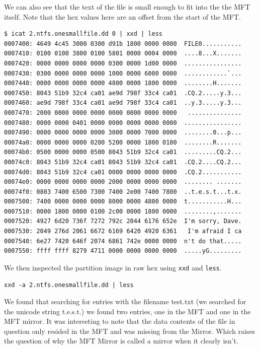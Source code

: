 \documentclass[a4paper,
    11pt,
    normalheadings,
    parindent,
    UKenglish,
    abstracton,
    ]{scrartcl}
\begin{document}
We can also see that the text of the file is small enough to fit into the the MFT itself. Note that the hex values here are an offset from the start of the MFT.
\begin{verbatim}
$ icat 2.ntfs.onesmallfile.dd 0 | xxd | less
0007400: 4649 4c45 3000 0300 d91b 1800 0000 0000  FILE0...........
0007410: 0100 0100 3800 0100 5801 0000 0004 0000  ....8...X.......
0007420: 0000 0000 0000 0000 0300 0000 1d00 0000  ................
0007430: 0300 0000 0000 0000 1000 0000 6000 0000  ............`...
0007440: 0000 0000 0000 0000 4800 0000 1800 0000  ........H.......
0007450: 8043 51b9 32c4 ca01 ae9d 798f 33c4 ca01  .CQ.2.....y.3...
0007460: ae9d 798f 33c4 ca01 ae9d 798f 33c4 ca01  ..y.3.....y.3...
0007470: 2000 0000 0000 0000 0000 0000 0000 0000   ...............
0007480: 0000 0000 0401 0000 0000 0000 0000 0000  ................
0007490: 0000 0000 0000 0000 3000 0000 7000 0000  ........0...p...
00074a0: 0000 0000 0000 0200 5200 0000 1800 0100  ........R.......
00074b0: 0500 0000 0000 0500 8043 51b9 32c4 ca01  .........CQ.2...
00074c0: 8043 51b9 32c4 ca01 8043 51b9 32c4 ca01  .CQ.2....CQ.2...
00074d0: 8043 51b9 32c4 ca01 0000 0000 0000 0000  .CQ.2...........
00074e0: 0000 0000 0000 0000 2000 0000 0000 0000  ........ .......
00074f0: 0803 7400 6500 7300 7400 2e00 7400 7800  ..t.e.s.t...t.x.
0007500: 7400 0000 0000 0000 8000 0000 4800 0000  t...........H...
0007510: 0000 1800 0000 0100 2c00 0000 1800 0000  ........,.......
0007520: 4927 6d20 736f 7272 792c 2044 6176 652e  I'm sorry, Dave.
0007530: 2049 276d 2061 6672 6169 6420 4920 6361   I'm afraid I ca
0007540: 6e27 7420 646f 2074 6861 742e 0000 0000  n't do that.....
0007550: ffff ffff 8279 4711 0000 0000 0000 0000  .....yG.........
\end{verbatim}


We then inspected the partition image in raw hex using \texttt{xxd} and \texttt{less}.
\begin{verbatim}
xxd -a 2.ntfs.onesmallfile.dd | less
\end{verbatim}
We found that searching for entries with the filename test.txt (we searched for the unicode string t.e.s.t.) we found two entries, one in the MFT and one in the MFT mirror. It was interesting to note that the data contents of the file in question only resided in the MFT and was missing from the Mirror. Which raises the question of why the MFT Mirror is called a mirror when it clearly isn't.
\end{document}
